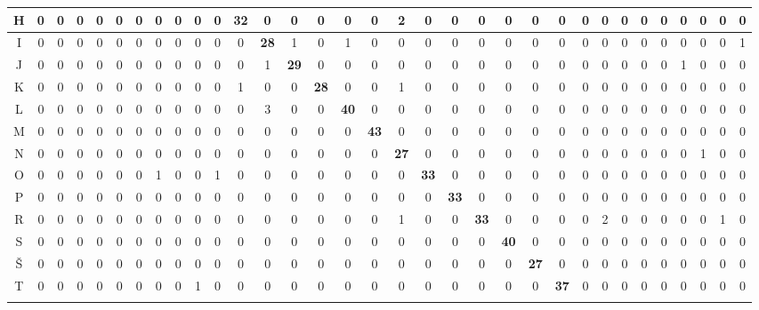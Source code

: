 \begin{table}[]
{\begin{tabular}{|c|c|c|c|c|c|c|c|c|c|c|c|c|c|c|c|c|c|c|c|c|c|c|c|c|c|c|c|c|c|c|c|c|}
H & 0 & 0 & 0 & 0 & 0 & 0 & 0 & 0 & 0 & 0 & \textbf{32} & 0 & 0 & 0 & 0 & 0 & 2 & 0 & 0 & 0 & 0 & 0 & 0 & 0 & 0 & 0 & 0 & 0 & 0 & 0 & 0 & 0           \\ \hline \rowcolor{gray1}
I & 0 & 0 & 0 & 0 & 0 & 0 & 0 & 0 & 0 & 0 & 0 & \textbf{28} & 1 & 0 & 1 & 0 & 0 & 0 & 0 & 0 & 0 & 0 & 0 & 0 & 0 & 0 & 0 & 0 & 0 & 0 & 0 & 1           \\ \hline
J & 0 & 0 & 0 & 0 & 0 & 0 & 0 & 0 & 0 & 0 & 0 & 1 & \textbf{29} & 0 & 0 & 0 & 0 & 0 & 0 & 0 & 0 & 0 & 0 & 0 & 0 & 0 & 0 & 0 & 1 & 0 & 0 & 0           \\ \hline \rowcolor{gray1}
K & 0 & 0 & 0 & 0 & 0 & 0 & 0 & 0 & 0 & 0 & 1 & 0 & 0 & \textbf{28} & 0 & 0 & 1 & 0 & 0 & 0 & 0 & 0 & 0 & 0 & 0 & 0 & 0 & 0 & 0 & 0 & 0 & 0           \\ \hline
L & 0 & 0 & 0 & 0 & 0 & 0 & 0 & 0 & 0 & 0 & 0 & 3 & 0 & 0 & \textbf{40} & 0 & 0 & 0 & 0 & 0 & 0 & 0 & 0 & 0 & 0 & 0 & 0 & 0 & 0 & 0 & 0 & 0           \\ \hline \rowcolor{gray1}
M & 0 & 0 & 0 & 0 & 0 & 0 & 0 & 0 & 0 & 0 & 0 & 0 & 0 & 0 & 0 & \textbf{43} & 0 & 0 & 0 & 0 & 0 & 0 & 0 & 0 & 0 & 0 & 0 & 0 & 0 & 0 & 0 & 0           \\ \hline
N & 0 & 0 & 0 & 0 & 0 & 0 & 0 & 0 & 0 & 0 & 0 & 0 & 0 & 0 & 0 & 0 & \textbf{27} & 0 & 0 & 0 & 0 & 0 & 0 & 0 & 0 & 0 & 0 & 0 & 0 & 1 & 0 & 0           \\ \hline \rowcolor{gray1}
O & 0 & 0 & 0 & 0 & 0 & 0 & 1 & 0 & 0 & 1 & 0 & 0 & 0 & 0 & 0 & 0 & 0 & \textbf{33} & 0 & 0 & 0 & 0 & 0 & 0 & 0 & 0 & 0 & 0 & 0 & 0 & 0 & 0           \\ \hline
P & 0 & 0 & 0 & 0 & 0 & 0 & 0 & 0 & 0 & 0 & 0 & 0 & 0 & 0 & 0 & 0 & 0 & 0 & \textbf{33} & 0 & 0 & 0 & 0 & 0 & 0 & 0 & 0 & 0 & 0 & 0 & 0 & 0           \\ \hline \rowcolor{gray1}
R & 0 & 0 & 0 & 0 & 0 & 0 & 0 & 0 & 0 & 0 & 0 & 0 & 0 & 0 & 0 & 0 & 1 & 0 & 0 & \textbf{33} & 0 & 0 & 0 & 0 & 2 & 0 & 0 & 0 & 0 & 0 & 1 & 0           \\ \hline
S & 0 & 0 & 0 & 0 & 0 & 0 & 0 & 0 & 0 & 0 & 0 & 0 & 0 & 0 & 0 & 0 & 0 & 0 & 0 & 0 & \textbf{40} & 0 & 0 & 0 & 0 & 0 & 0 & 0 & 0 & 0 & 0 & 0           \\ \hline \rowcolor{gray1}
Š & 0 & 0 & 0 & 0 & 0 & 0 & 0 & 0 & 0 & 0 & 0 & 0 & 0 & 0 & 0 & 0 & 0 & 0 & 0 & 0 & 0 & \textbf{27} & 0 & 0 & 0 & 0 & 0 & 0 & 0 & 0 & 0 & 0           \\ \hline
T & 0 & 0 & 0 & 0 & 0 & 0 & 0 & 0 & 1 & 0 & 0 & 0 & 0 & 0 & 0 & 0 & 0 & 0 & 0 & 0 & 0 & 0 & \textbf{37} & 0 & 0 & 0 & 0 & 0 & 0 & 0 & 0 & 0           \\ \hline \rowcolor{gray1}

\end{tabular}}
\end{table}
